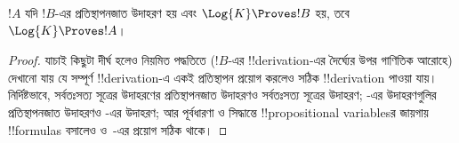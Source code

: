 \documentclass[../../../include/open-logic-section]{subfiles}
\begin{document}
\begin{prop}
  $!A$ যদি $!B$-এর প্রতিস্থাপনজাত উদাহরণ হয় এবং $\Log{K} \Proves !B$ হয়, তবে $\Log{K} \Proves !A$।
\end{prop}

\begin{proof}
  যাচাই কিছুটা দীর্ঘ হলেও নিয়মিত পদ্ধতিতে ($!B$-এর !!{derivation}-এর দৈর্ঘ্যের উপর গাণিতিক আরোহে) দেখানো যায় যে সম্পূর্ণ !!{derivation}-এ একই প্রতিস্থাপন প্রয়োগ করলেও সঠিক !!{derivation} পাওয়া যায়। নির্দিষ্টভাবে, সর্বতঃসত্য সূত্রের উদাহরণের প্রতিস্থাপনজাত উদাহরণও সর্বতঃসত্য সূত্রের উদাহরণ; -এর উদাহরণগুলির প্রতিস্থাপনজাত উদাহরণও -এর উদাহরণ; আর পূর্বধারণা ও সিদ্ধান্তে !!{propositional variable}sর জায়গায় !!{formula}s বসালেও \MP{} ও~\Nec{}-এর প্রয়োগ সঠিক থাকে।
\end{proof}
\end{document}
